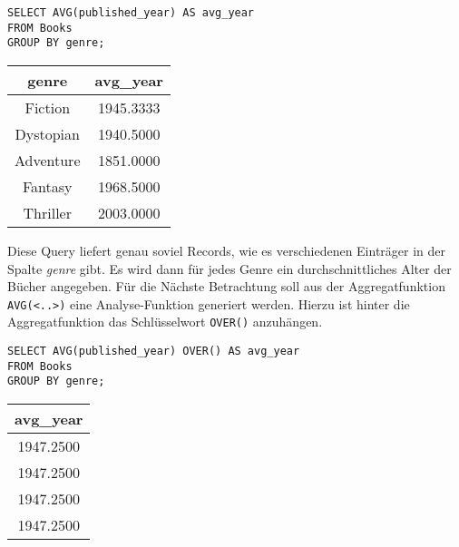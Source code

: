\begin{minipage}{0.68\textwidth}
	 \begin{lstlisting}
SELECT AVG(published_year) AS avg_year
FROM Books
GROUP BY genre;
	\end{lstlisting}
\end{minipage}
\hfill
\begin{minipage}{0.28\textwidth}
	\centering
	\begin{tabular}{|c|c|}
		\hline
		\textbf{genre} & \textbf{avg\_year} \\
		\hline
		Fiction        & 1945.3333          \\
		\hline
		Dystopian      & 1940.5000          \\
		\hline
		Adventure      & 1851.0000          \\
		\hline
		Fantasy        & 1968.5000          \\
		\hline
		Thriller       & 2003.0000          \\
		\hline
	\end{tabular}
	 \label{tab:avg_year_genre}
\end{minipage}

Diese Query liefert genau soviel Records, wie es verschiedenen Einträger in der Spalte
\textit{genre} gibt. Es wird dann für jedes Genre ein durchschnittliches Alter der
Bücher angegeben. Für die Nächste Betrachtung soll aus der Aggregatfunktion
\texttt{AVG(<..>)} eine Analyse-Funktion generiert werden. Hierzu ist hinter die
Aggregatfunktion das Schlüsselwort \texttt{OVER()} anzuhängen.
\begin{minipage}{0.68\textwidth}
	 \begin{lstlisting}
SELECT AVG(published_year) OVER() AS avg_year
FROM Books
GROUP BY genre;
	\end{lstlisting}
\end{minipage}
\hfill
\begin{minipage}{0.28\textwidth}
	\centering
	\begin{tabular}{|c|}
		\hline
		\textbf{avg\_year} \\
		\hline
		1947.2500          \\
		\hline
		1947.2500          \\
		\hline
		1947.2500          \\
		\hline
		1947.2500          \\
		\hline
	\end{tabular}
	 \label{tab:avg_year_over}
\end{minipage}

